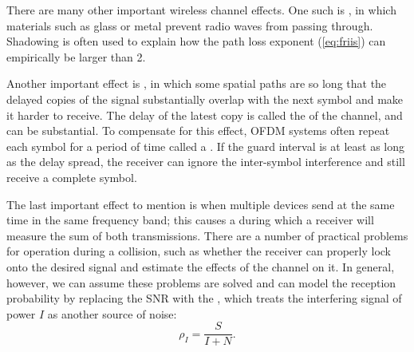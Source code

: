 There are many other important wireless channel effects. One such is , in which materials such as glass or metal prevent radio waves from passing through. Shadowing is often used to explain how the path loss exponent (\eqref{eq:friis}) can empirically be larger than 2.

Another important effect is , in which some spatial paths are so long that the delayed copies of the signal substantially overlap with the next symbol and make it harder to receive. The delay of the latest copy is called the  of the channel, and can be substantial. To compensate for this effect, OFDM systems often repeat each symbol for a period of time called a . If the guard interval is at least as long as the delay spread, the receiver can ignore the inter-symbol interference and still receive a complete symbol.


The last important effect to mention is when multiple devices send at the same time in the same frequency band; this  causes a  during which a receiver will measure the sum of both transmissions. There are a number of practical problems for operation during a collision, such as whether the receiver can properly lock onto the desired signal and estimate the effects of the channel on it. In general, however, we can assume these problems are solved and can model the reception probability by replacing the SNR with the , which treats the interfering signal of power $I$ as another source of noise:
\begin{equation}
\label{eq:sinr}
\rho_I = \frac{S}{I+N}.
\end{equation}

